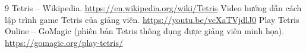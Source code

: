 \documentclass[13pt,a4paper]{extarticle}
\begin{document}
\begin{thebibliography}{9}
 Tetris -- Wikipedia. \url{https://en.wikipedia.org/wiki/Tetris}
 Video hướng dẫn cách lập trình game Tetris của giảng viên. \url{https://youtu.be/vcXaTVjdlJ0}
 Play Tetris Online -- GoMagic (phiên bản Tetris thông dụng được giảng viên minh họa). \url{https://gomagic.org/play-tetris/}
\end{thebibliography}
\end{document}
